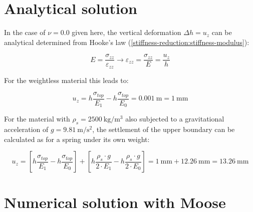 
\section{Analytical solution}
\label{stiffness-reduction:sec:analytical-solution}

In the case of $\nu = 0.0$ given here, the vertical deformation $\Delta h =
    u_z$ can be analytical determined from Hooke's law
(\autoref{stiffness-reduction:stiffness-modulus}):

\begin{equation}
    \label{stiffness-reduction:stiffness-modulus}
    E = \frac{\sigma_{zz}}{\varepsilon_{zz}} \rightarrow \varepsilon_{zz}
    = \frac{\sigma_{zz}}{E} = \frac{u_z}{h}
\end{equation}

For the weightless material this leads to:

\begin{equation}
    u_z = h \frac{\sigma_{top}}{E_1} - h \frac{\sigma_{top}}{E_0} = \SI{0.001}{\metre} = \SI{1}{\milli\metre}
\end{equation}

For the material with $\rho_s = \qty[per-mode
        =symbol]{2500}{\kilogram\per\cubic\metre}$ also subjected to a gravitational
acceleration of $g = \qty[per-mode = symbol]{9.81}{\metre\per\square\second}$,
the settlement of the upper boundary can be calculated as for a spring under
its own weight:

\begin{equation}
    u_z = \left[ h \frac{\sigma_{top}}{E_1} - h \frac{\sigma_{top}}{E_0} \right] + \left[ h \frac{\rho_s \cdot g}{2 \cdot E_1} - h \frac{\rho_s \cdot g }{2 \cdot E_0} \right] = \qty{1}{\milli\metre} + \qty{12.26}{\milli\metre} = \qty{13.26}{\milli\metre}
\end{equation}

\section{Numerical solution with Moose}
\label{stiffness-reduction:sec:moose}

